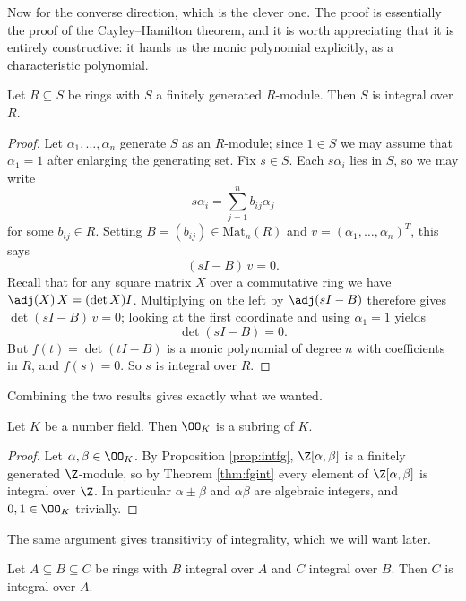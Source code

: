 Now for the converse direction, which is the clever one. The proof is essentially the proof of the Cayley--Hamilton theorem, and it is worth appreciating that it is entirely constructive: it hands us the monic polynomial explicitly, as a characteristic polynomial.

\begin{theorem}\label{thm:fgint}
	Let $R \subseteq S$ be rings with $S$ a finitely generated $R$-module. Then $S$ is integral over $R$.
\end{theorem}

\begin{proof}
	Let $\alpha_1, \dots, \alpha_n$ generate $S$ as an $R$-module; since $1 \in S$ we may assume that $\alpha_1 = 1$ after enlarging the generating set. Fix $s \in S$. Each $s\alpha_i$ lies in $S$, so we may write
	$$s\alpha_i = \sum_{j=1}^n b_{ij}\alpha_j$$
	for some $b_{ij} \in R$. Setting $B = (b_{ij}) \in \mathrm{Mat}_n(R)$ and $v = (\alpha_1, \dots, \alpha_n)^T$, this says
	$$(sI - B)\,v = 0.$$
	Recall that for any square matrix $X$ over a commutative ring we have $\adj(X)\,X = (\det X) I$. Multiplying on the left by $\adj(sI - B)$ therefore gives $\det(sI - B)\, v = 0$; looking at the first coordinate and using $\alpha_1 = 1$ yields
	$$\det(sI - B) = 0.$$
	But $f(t) = \det(tI - B)$ is a monic polynomial of degree $n$ with coefficients in $R$, and $f(s) = 0$. So $s$ is integral over $R$.
\end{proof}

Combining the two results gives exactly what we wanted.

\begin{corollary}\label{cor:OKring}
	Let $K$ be a number field. Then $\OO_K$ is a subring of $K$.
\end{corollary}

\begin{proof}
	Let $\alpha, \beta \in \OO_K$. By Proposition \ref{prop:intfg}, $\Z[\alpha,\beta]$ is a finitely generated $\Z$-module, so by Theorem \ref{thm:fgint} every element of $\Z[\alpha,\beta]$ is integral over $\Z$. In particular $\alpha \pm \beta$ and $\alpha\beta$ are algebraic integers, and $0, 1 \in \OO_K$ trivially.
\end{proof}

The same argument gives transitivity of integrality, which we will want later.

\begin{corollary}\label{cor:transint}
	Let $A \subseteq B \subseteq C$ be rings with $B$ integral over $A$ and $C$ integral over $B$. Then $C$ is integral over $A$.
\end{corollary}

